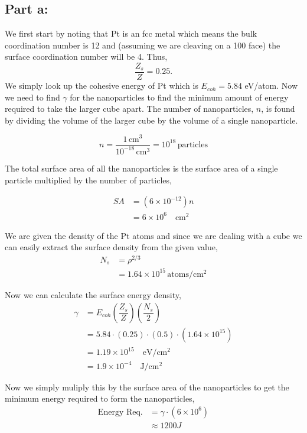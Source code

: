 \documentclass[12pt]{article}
\renewcommand{\=}[1]{\stackrel{#1}{=}} %
\theoremstyle{definition}
\theoremstyle{remark}
\begin{document}
 
 \subsection*{Part a:}
 
 We first start by noting that Pt is an fcc metal which means the bulk coordination number is 12 and (assuming we are cleaving on a {100} face) the surface coordination number will be 4. Thus,
 \[
 	\dfrac{Z_s}{Z} = 0.25.
 \]
We simply look up the cohesive energy of Pt which is $E_{coh} = 5.84$ eV/atom. Now we need to find $\gamma$ for the nanoparticles to find the minimum amount of energy required to take the larger cube apart. The number of nanoparticles, $n$, is found by dividing the volume of the larger cube by the volume of a single nanoparticle.

\[
	n = \dfrac{1 \,\text{cm}^3}{10^{-18}\,\text{cm}^3} = 10^{18} \,\text{particles}
\] 

The total surface area of all the nanoparticles is the surface area of a single particle multiplied by the number of particles,

\begin{align*}
	SA &= \left(6\times 10^{-12}\right)n\\[3mm]
		&= 6 \times 10^6 \quad \text{cm}^2
\end{align*}

We are given the density of the Pt atoms and since we are dealing with a cube we can easily extract the surface density from the given value,
\begin{align*}
	N_s &= \rho^{2/3}\\
		&= 1.64\times 10^{15} \, \text{atoms/cm$^2$}
\end{align*}

Now we can calculate the surface energy density,
\begin{align*}
	\gamma &= E_{coh} \left(\dfrac{Z_s}{Z}\right)\left(\dfrac{N_s}{2}\right)\\[3mm]
		&= 5.84 \cdot (0.25) \cdot (0.5) \cdot \left(1.64\times 10^{15}\right)\\[3mm]
		&= 1.19 \times 10^{15} \quad \text{eV/cm$^2$}\\[3mm]
		&= 1.9 \times 10^{-4} \quad \text{J/cm$^2$}
\end{align*}

Now we simply muliply this by the surface area of the nanoparticles to get the minimum energy required to form the nanoparticles,
\begin{align*}
 \text{Energy Req.} &= \gamma \cdot \left(6\times 10^6\right)\\[3mm]
 	&\approx 1200 J
\end{align*}
\end{document}
